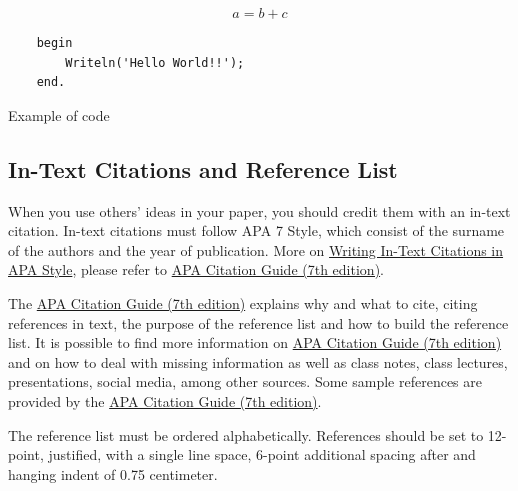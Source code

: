 \documentclass[english, spanish, brazilian]{RBIEarticle} %
\begin{document}
    
    \begin{equation}
    	a = b + c
    	\label{eq:one}
    \end{equation}

    \begin{code}[h]
    	\begin{lstlisting}
    begin
        Writeln('Hello World!!');
    end.
    	\end{lstlisting}
    	\caption{Example of code}
    	\label{code:one}
    \end{code}


    \subsection{In-Text Citations and Reference List}
    
    When you use others' ideas in your paper, you should credit them with an in-text citation. In-text citations must follow APA 7 Style, which consist of the surname of the authors and the year of publication. More on \href{https://apastyle.apa.org/}{Writing In-Text Citations in APA Style}, please refer to \href{https://libguides.brenau.edu/APA7}{APA Citation Guide (7th edition)}.
    
    The  \href{https://libguides.brenau.edu/APA7}{APA Citation Guide (7th edition)} explains why and what to cite, citing references in text, the purpose of the reference list and how to build the reference list. It is possible to find more information on  \href{https://libguides.brenau.edu/APA7}{APA Citation Guide (7th edition)} and on how to deal with missing information as well as class notes, class lectures, presentations, social media, among other sources. Some sample references are provided by the  \href{https://libguides.brenau.edu/APA7}{APA Citation Guide (7th edition)}.
    
    The reference list must be ordered alphabetically. References should be set to 12-point, justified, with a single line space, 6-point additional spacing after and hanging indent of 0.75 centimeter.
    
\end{document}
